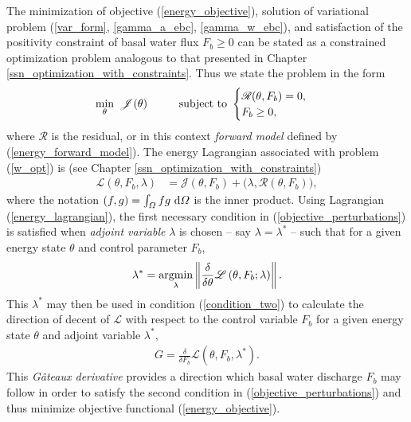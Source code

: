The minimization of objective (\ref{energy_objective}), solution of variational problem (\ref{var_form}, \ref{gamma_a_ebc}, \ref{gamma_w_ebc}), and satisfaction of the positivity constraint of basal water flux $F_b \geq 0$ can be stated as a constrained optimization problem analogous to that presented in Chapter \ref{ssn_optimization_with_constraints}.   Thus we state the problem in the form
\begin{align}
  \min_{\theta}\ \mathscr{J}(\theta) \hspace{10mm} \text{subject to  }
  \begin{cases}
    \mathscr{R}(\theta, F_b) = 0,\\
    F_b \geq 0,
  \end{cases}
  \label{w_opt}
\end{align}
where $\mathscr{R}$ is the residual, or in this context   \emph{forward model} defined by (\ref{energy_forward_model}).  The energy Lagrangian  associated with problem (\ref{w_opt}) is (see Chapter \ref{ssn_optimization_with_constraints})
\begin{align}
  \label{energy_lagrangian}
  \mathscr{L}(\theta, F_b, \lambda) &= \mathscr{J}(\theta, F_b) + \big( \lambda, \mathscr{R}(\theta, F_b) \big),
\end{align}
where the notation $(f,g) = \int_{\varOmega} f g \ \mathrm{d}\varOmega$ is the inner product.  Using Lagrangian (\ref{energy_lagrangian}), the first necessary condition in (\ref{objective_perturbations}) is satisfied when  \emph{adjoint variable} $\lambda$ is chosen -- say $\lambda = \lambda^*$ -- such that for a given energy state $\theta$ and control parameter $F_b$, 
\begin{align}
  \label{energy_adjoint}
  \lambda^* = \operatorname*{argmin}\limits_{\lambda} \left\Vert \frac{\delta}{\delta \theta} \mathscr{L} \left( \theta, F_b; \lambda \right) \right\Vert.
\end{align}
This $\lambda^*$ may then be used in condition (\ref{condition_two}) to calculate the direction of decent of $\mathscr{L}$ with respect to the control variable $F_b$ for a given energy state $\theta$ and adjoint variable $\lambda^*$,
\begin{align}
  G = \frac{\delta}{\delta F_b} \mathscr{L} (\theta, F_b, \lambda^*).
\end{align}
This \emph{G\^{a}teaux derivative} provides a direction which basal water discharge $F_b$ may follow in order to satisfy the second condition in (\ref{objective_perturbations}) and thus minimize objective functional (\ref{energy_objective}).

